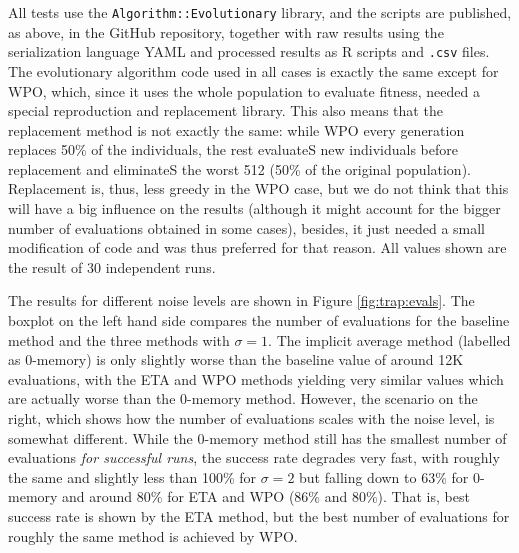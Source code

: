\documentclass{llncs}
\begin{document}
%
All tests use the {\tt Algorithm::Evolutionary} library, and the scripts
are published, as above, in the GitHub repository, together with raw
results using the serialization language YAML
and processed results as R scripts and {\tt .csv} files. The evolutionary algorithm code used in all
cases is exactly the same except for WPO, which, since it uses the
whole population to evaluate fitness, needed a special reproduction
and replacement library. This also means that the replacement method
is not exactly the same: while WPO every generation replaces  50\% of
the individuals, the rest evaluateS new individuals before replacement
and eliminateS the worst 512 (50\% of the original
population). 
Replacement is, thus, less greedy in the WPO case, but
we do not think that this will have a big influence on the results
(although it might account for the bigger number of evaluations obtained in some
cases), besides, it just needed a small modification of code and was
thus preferred for that reason. All values shown are the result of 30
independent runs.

The results for different noise levels are shown in Figure
\ref{fig:trap:evals}. The boxplot on the left hand side compares the
number of evaluations for the baseline method and the three methods
with  $\sigma=1$. The implicit average method (labelled as 0-memory) is
only slightly worse than the baseline value of around 12K evaluations,
with the ETA and WPO methods yielding very similar values which are
actually worse than the 0-memory method. However, the scenario on the
right,
 which shows how the number of evaluations scales with the noise
level, is somewhat different. 
While the 0-memory method still has the
smallest number of evaluations {\em for successful runs}, the success
rate degrades very fast, with roughly the same and slightly less than
100\% for $\sigma=2$ but falling down to 63\% for 0-memory and around
80\% for ETA and WPO (86\% and 80\%). That is, best success rate is
shown by the ETA method, but the best number of evaluations for
roughly the same method is achieved by WPO. 
\end{document}
